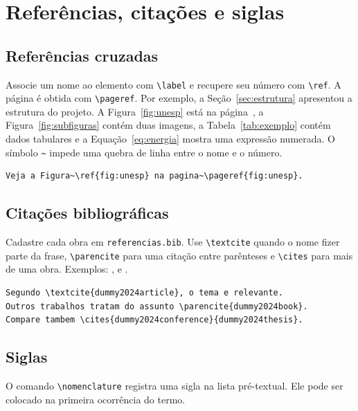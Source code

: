 \section{Referências, citações e siglas}

\subsection{Referências cruzadas}

Associe um nome ao elemento com \verb|\label| e recupere seu número com
\verb|\ref|. A página é obtida com \verb|\pageref|. Por exemplo, a
Seção~\ref{sec:estrutura} apresentou a estrutura do projeto. A
Figura~\ref{fig:unesp} está na página~\pageref{fig:unesp}, a
Figura~\ref{fig:subfiguras} contém duas imagens, a Tabela~\ref{tab:exemplo}
contém dados tabulares e a Equação~\ref{eq:energia} mostra uma expressão
numerada. O símbolo \verb|~| impede uma quebra de linha entre o nome e o número.

\begin{lstlisting}[language={[LaTeX]TeX},caption={Referência cruzada}]
Veja a Figura~\ref{fig:unesp} na pagina~\pageref{fig:unesp}.
\end{lstlisting}

\subsection{Citações bibliográficas}

Cadastre cada obra em \texttt{referencias.bib}. Use \verb|\textcite| quando o
nome fizer parte da frase, \verb|\parencite| para uma citação entre parênteses e
\verb|\cites| para mais de uma obra. Exemplos: \textcite{dummy2024article},
\parencite{dummy2024book} e \cites{dummy2024conference}{dummy2024thesis}.

\begin{lstlisting}[language={[LaTeX]TeX},caption={Comandos de citação}]
Segundo \textcite{dummy2024article}, o tema e relevante.
Outros trabalhos tratam do assunto \parencite{dummy2024book}.
Compare tambem \cites{dummy2024conference}{dummy2024thesis}.
\end{lstlisting}

\subsection{Siglas}

O comando \verb|\nomenclature| registra uma sigla na lista pré-textual. Ele pode
ser colocado na primeira ocorrência do termo.

